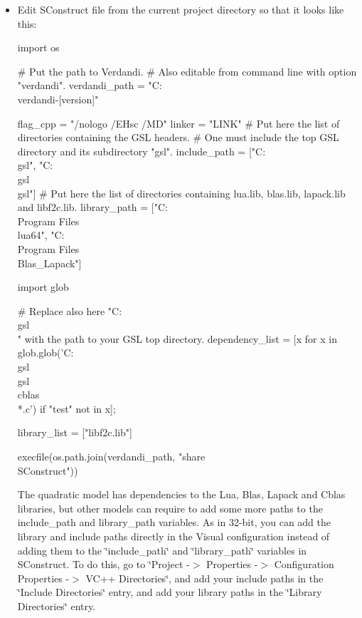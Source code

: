 \documentclass{tufte-book}
\begin{document}
\begin{itemize}
\item \-Edit {\ttfamily \-S\-Construct} file from the current project directory so that it looks like this\-:



 \begin{frame_python}
import os

# Put the path to Verdandi.
# Also editable from command line with option "verdandi".
verdandi_path = "C:\\verdandi-[version]"

flag_cpp = "/nologo /EHsc /MD"
linker = "LINK"
# Put here the list of directories containing the GSL headers.
# One must include the top GSL directory and its subdirectory "gsl".
include_path = ["C:\\gsl", "C:\\gsl\\gsl"]
# Put here the list of directories containing lua.lib, blas.lib, lapack.lib and libf2c.lib.
library_path = ["C:\\Program Files\\lua64", "C:\\Program Files\\Blas_Lapack"]

import glob

# Replace also here "C:\\gsl\\" with the path to your GSL top directory.
dependency_list = [x for x in glob.glob('C:\\gsl\\gsl\\cblas\\*.c') if "test" not in x];

library_list = ["libf2c.lib"]

execfile(os.path.join(verdandi_path, "share\\SConstruct"))
\end{frame_python}


\-The quadratic model has dependencies to the \-Lua, \-Blas, \-Lapack and \-Cblas libraries, but other models can require to add some more paths to the {\ttfamily include\-\_\-path} and {\ttfamily library\-\_\-path} variables. \-As in 32-\/bit, you can add the library and include paths directly in the \-Visual configuration instead of adding them to the \char`\"{}include\-\_\-path\char`\"{} and \char`\"{}library\-\_\-path\char`\"{} variables in {\ttfamily \-S\-Construct}. \-To do this, go to \char`\"{}\-Project -\/$>$ Properties -\/$>$ Configuration Properties -\/$>$ V\-C++ Directories\char`\"{}, and add your include paths in the \char`\"{}\-Include Directories\char`\"{} entry, and add your library paths in the \char`\"{}\-Library Directories\char`\"{} entry.



\end{itemize}
\end{document}
